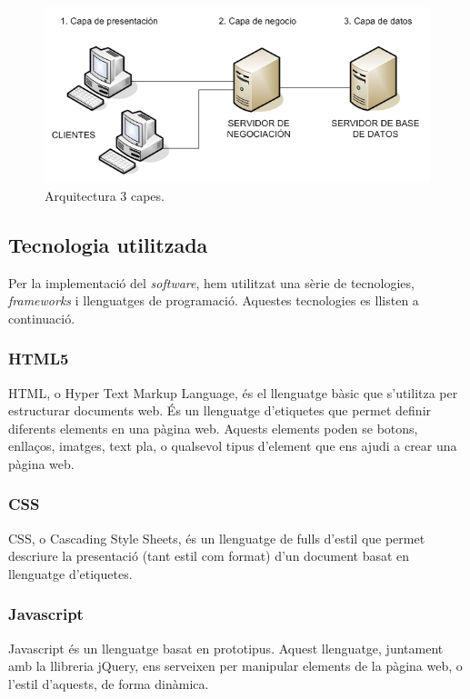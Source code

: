 \documentclass[11pt,catalan,listoffigures,listoftables]{tfgetsinf}
\begin{document}
\begin{figure}[h]
\includegraphics[width=15cm]{images/image12}
\centering
\caption[Figura 4.1]{Arquitectura 3 capes.}
\centering
\end{figure}

\subsection{Tecnologia utilitzada}
Per la implementació del \textit{software}, hem utilitzat una sèrie de tecnologies, \textit{frameworks} i llenguatges de programació. Aquestes tecnologies es llisten a continuació.

\subsubsection{HTML5}

HTML, o Hyper Text Markup Language, és el llenguatge bàsic que s'utilitza per estructurar documents web. És un llenguatge d'etiquetes que permet definir diferents elements en una pàgina web. Aquests elements poden se botons, enllaços, imatges, text pla, o qualsevol tipus d'element que ens ajudi a crear una pàgina web.

\subsubsection{CSS}

CSS, o Cascading Style Sheets, és un llenguatge de fulls d'estil que permet descriure la presentació (tant estil com format) d'un document basat en llenguatge d'etiquetes.

\subsubsection{Javascript}

Javascript és un llenguatge basat en prototipus. Aquest llenguatge, juntament amb la llibreria jQuery, ens serveixen per manipular elements de la pàgina web, o l'estil d'aquests, de forma dinàmica.
\end{document}
